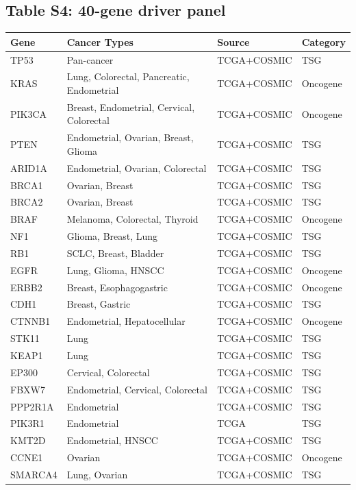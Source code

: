 \documentclass[11pt,a4paper]{article}
\begin{document}
\subsection{Table S4: 40-gene driver panel}
\begin{table}[H]
\centering
\footnotesize
\begin{tabular}{llll}
\toprule
\textbf{Gene} & \textbf{Cancer Types} & \textbf{Source} & \textbf{Category} \\
\midrule
TP53 & Pan-cancer & TCGA+COSMIC & TSG \\
KRAS & Lung, Colorectal, Pancreatic, Endometrial & TCGA+COSMIC & Oncogene \\
PIK3CA & Breast, Endometrial, Cervical, Colorectal & TCGA+COSMIC & Oncogene \\
PTEN & Endometrial, Ovarian, Breast, Glioma & TCGA+COSMIC & TSG \\
ARID1A & Endometrial, Ovarian, Colorectal & TCGA+COSMIC & TSG \\
BRCA1 & Ovarian, Breast & TCGA+COSMIC & TSG \\
BRCA2 & Ovarian, Breast & TCGA+COSMIC & TSG \\
BRAF & Melanoma, Colorectal, Thyroid & TCGA+COSMIC & Oncogene \\
NF1 & Glioma, Breast, Lung & TCGA+COSMIC & TSG \\
RB1 & SCLC, Breast, Bladder & TCGA+COSMIC & TSG \\
EGFR & Lung, Glioma, HNSCC & TCGA+COSMIC & Oncogene \\
ERBB2 & Breast, Esophagogastric & TCGA+COSMIC & Oncogene \\
CDH1 & Breast, Gastric & TCGA+COSMIC & TSG \\
CTNNB1 & Endometrial, Hepatocellular & TCGA+COSMIC & Oncogene \\
STK11 & Lung & TCGA+COSMIC & TSG \\
KEAP1 & Lung & TCGA+COSMIC & TSG \\
EP300 & Cervical, Colorectal & TCGA+COSMIC & TSG \\
FBXW7 & Endometrial, Cervical, Colorectal & TCGA+COSMIC & TSG \\
PPP2R1A & Endometrial & TCGA+COSMIC & TSG \\
PIK3R1 & Endometrial & TCGA & TSG \\
KMT2D & Endometrial, HNSCC & TCGA+COSMIC & TSG \\
CCNE1 & Ovarian & TCGA+COSMIC & Oncogene \\
SMARCA4 & Lung, Ovarian & TCGA+COSMIC & TSG \\

\end{tabular}
\end{table}
\end{document}
